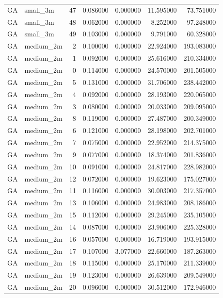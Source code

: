 \begin{tabular}{llrrrrr}
GA & small_3m & 47 & 0.086000 & 0.000000 & 11.595000 & 73.751000 \\
GA & small_3m & 48 & 0.062000 & 0.000000 & 8.252000 & 97.248000 \\
GA & small_3m & 49 & 0.103000 & 0.000000 & 9.791000 & 60.328000 \\
GA & medium_2m & 2 & 0.100000 & 0.000000 & 22.924000 & 193.083000 \\
GA & medium_2m & 1 & 0.092000 & 0.000000 & 25.616000 & 210.334000 \\
GA & medium_2m & 0 & 0.114000 & 0.000000 & 24.570000 & 201.505000 \\
GA & medium_2m & 5 & 0.131000 & 0.000000 & 31.706000 & 238.442000 \\
GA & medium_2m & 4 & 0.092000 & 0.000000 & 28.193000 & 220.065000 \\
GA & medium_2m & 3 & 0.080000 & 0.000000 & 20.033000 & 209.095000 \\
GA & medium_2m & 8 & 0.119000 & 0.000000 & 27.487000 & 200.349000 \\
GA & medium_2m & 6 & 0.121000 & 0.000000 & 28.198000 & 202.701000 \\
GA & medium_2m & 7 & 0.075000 & 0.000000 & 22.952000 & 214.375000 \\
GA & medium_2m & 9 & 0.077000 & 0.000000 & 18.374000 & 201.836000 \\
GA & medium_2m & 10 & 0.091000 & 0.000000 & 24.817000 & 228.982000 \\
GA & medium_2m & 12 & 0.072000 & 0.000000 & 19.623000 & 175.027000 \\
GA & medium_2m & 11 & 0.116000 & 0.000000 & 30.003000 & 217.357000 \\
GA & medium_2m & 13 & 0.106000 & 0.000000 & 24.983000 & 208.186000 \\
GA & medium_2m & 15 & 0.112000 & 0.000000 & 29.245000 & 235.105000 \\
GA & medium_2m & 14 & 0.087000 & 0.000000 & 23.906000 & 225.328000 \\
GA & medium_2m & 16 & 0.057000 & 0.000000 & 16.719000 & 193.915000 \\
GA & medium_2m & 17 & 0.107000 & 3.077000 & 22.660000 & 187.263000 \\
GA & medium_2m & 18 & 0.115000 & 0.000000 & 25.170000 & 211.339000 \\
GA & medium_2m & 19 & 0.123000 & 0.000000 & 26.639000 & 209.549000 \\
GA & medium_2m & 20 & 0.096000 & 0.000000 & 30.512000 & 172.946000 \\

\end{tabular}
